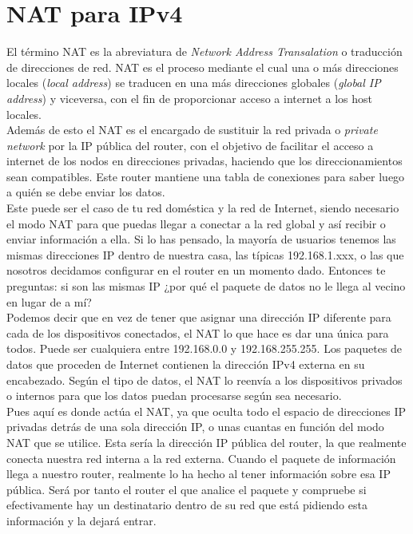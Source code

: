 \documentclass[
	12pt, %
	fleqn, %
	a4paper, %
	oneside, %
]{LegrandOrangeBook}
\begin{document}
\section{NAT para IPv4}
El término NAT es la abreviatura de \textit{Network Address Transalation} o traducción de direcciones de red. NAT es el proceso mediante el cual una o más direcciones locales (\textit{local address}) se traducen en una más direcciones globales (\textit{global IP address}) y viceversa, con el fin de proporcionar acceso a internet a los host locales.\\
Además de esto el NAT es el encargado de sustituir la red privada o \textit{private network} por la IP pública del router, con el objetivo de facilitar el acceso a internet de los nodos en direcciones privadas, haciendo que los direccionamientos sean compatibles. Este router mantiene una tabla de conexiones para saber luego a quién se debe enviar los datos.\\
Este puede ser el caso de tu red doméstica y la red de Internet, siendo necesario el modo NAT para que puedas llegar a conectar a la red global y así recibir o enviar información a ella. Si lo has pensado, la mayoría de usuarios tenemos las mismas direcciones IP dentro de nuestra casa, las típicas 192.168.1.xxx, o las que nosotros decidamos configurar en el router en un momento dado. Entonces te preguntas: si son las mismas IP ¿por qué el paquete de datos no le llega al vecino en lugar de a mí?\\
Podemos decir que en vez de tener que asignar una dirección IP diferente para cada de los dispositivos conectados, el NAT lo que hace es dar una única para todos. Puede ser cualquiera entre 192.168.0.0 y 192.168.255.255. Los paquetes de datos que proceden de Internet contienen la dirección IPv4 externa en su encabezado. Según el tipo de datos, el NAT lo reenvía a los dispositivos privados o internos para que los datos puedan procesarse según sea necesario.\\
Pues aquí es donde actúa el NAT, ya que oculta todo el espacio de direcciones IP privadas detrás de una sola dirección IP, o unas cuantas en función del modo NAT que se utilice. Esta sería la dirección IP pública del router, la que realmente conecta nuestra red interna a la red externa. Cuando el paquete de información llega a nuestro router, realmente lo ha hecho al tener información sobre esa IP pública. Será por tanto el router el que analice el paquete y compruebe si efectivamente hay un destinatario dentro de su red que está pidiendo esta información y la dejará entrar.
\end{document}
